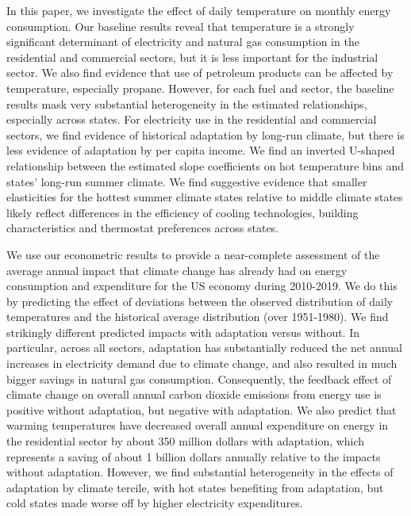\documentclass[11pt]{article}
\begin{document}
In this paper, we investigate the effect of daily temperature on monthly energy consumption. %
Our baseline results reveal that temperature is a strongly significant determinant of electricity and natural gas consumption in the residential and commercial sectors, but it is less important for the industrial sector. We also find evidence that use of petroleum products can be affected by temperature, especially propane. However, for each fuel and sector, the baseline results mask very substantial heterogeneity in the estimated relationships, especially across states. For electricity use in the residential and commercial sectors, we find evidence of historical adaptation by long-run climate, but there is less evidence of adaptation by per capita income. We find an inverted U-shaped relationship between the estimated slope coefficients on hot temperature bins and states' long-run summer climate. We find suggestive evidence that smaller elasticities for the hottest summer climate states relative to middle climate states likely reflect differences in the efficiency of cooling technologies, building characteristics and thermostat preferences across states.

We use our econometric results to provide a near-complete assessment of the average annual impact that climate change has already had on energy consumption and expenditure for the US economy during 2010-2019. We do this by predicting the effect of deviations between the observed distribution of daily temperatures and the historical average distribution (over 1951-1980). We find strikingly different predicted impacts with adaptation versus without. In particular, across all sectors, adaptation has substantially reduced the net annual increases in electricity demand due to climate change, and also resulted in much bigger savings in natural gas consumption. Consequently, the feedback effect of climate change on overall annual carbon dioxide emissions from energy use is positive without adaptation, but negative with adaptation. We also predict that warming temperatures have decreased overall annual expenditure on energy in the residential sector by about 350 million dollars with adaptation, which represents a saving of about 1 billion dollars annually relative to the impacts without adaptation. However, we find substantial heterogeneity in the effects of adaptation by climate tercile, with hot states benefiting from adaptation, but cold states made worse off by higher electricity expenditures.
\end{document}
